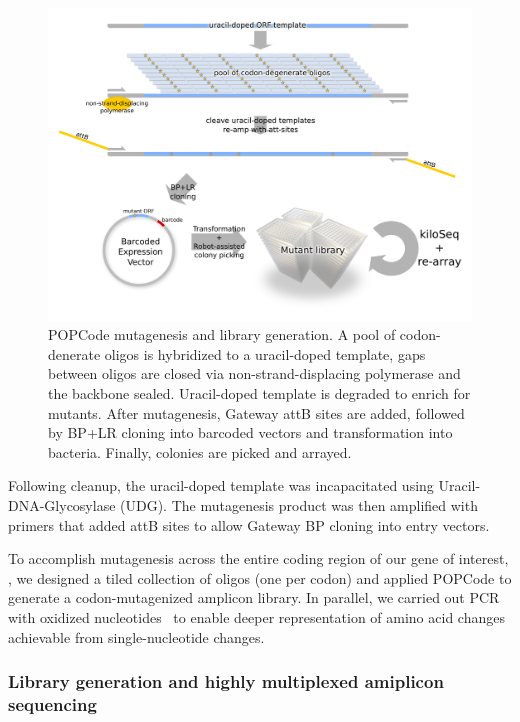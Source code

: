 \begin{figure}[h!]
	\centering
	\includegraphics[width=\textwidth]{img/popcode_schema.pdf}%
	\caption{POPCode mutagenesis and library generation. A pool of codon-denerate oligos is hybridized to a uracil-doped template, gaps between oligos are closed via non-strand-displacing polymerase and the backbone sealed. Uracil-doped template is degraded to enrich for mutants. After mutagenesis, Gateway attB sites are added, followed by BP+LR cloning into barcoded vectors and transformation into bacteria. Finally, colonies are picked and arrayed.}
	\label{fig:popcode_schema}
\end{figure}
Following cleanup, the uracil-doped template was incapacitated using Uracil-DNA-Glycosylase (UDG). The mutagenesis product was then amplified with primers that added attB sites to allow Gateway BP cloning into entry vectors.

To accomplish mutagenesis across the entire coding region of our gene of interest, , we designed a tiled collection of oligos (one per codon) and applied POPCode to generate a codon-mutagenized amplicon library.  In parallel, we carried out PCR with oxidized nucleotides~\cite{mohan_pcr_2011} to enable deeper representation of amino acid changes achievable from single-nucleotide changes.

\subsubsection{Library generation and highly multiplexed amiplicon sequencing}

